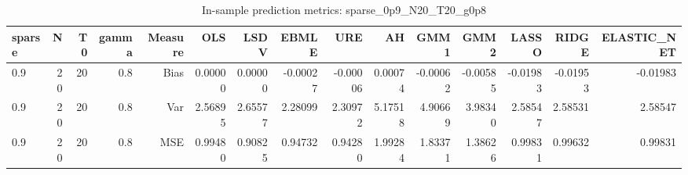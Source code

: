 \begin{table}[!htbp]\centering
\caption{In-sample prediction metrics: sparse_0p9_N20_T20_g0p8}
\label{tab:table2_sparse_0p9_N20_T20_g0p8}
\begin{tabular}{lrrrrrrrrrrrrrr}
\hline
sparse & N & T0 & gamma & Measure & OLS & LSDV & EBMLE & URE & AH & GMM1 & GMM2 & LASSO & RIDGE & ELASTIC_NET \\
\hline
0.9 & 20 & 20 & 0.8 & Bias & 0.00000 & 0.00000 & -0.00027 & -0.00006 & 0.00074 & -0.00062 & -0.00585 & -0.01983 & -0.01953 & -0.01983 \\
0.9 & 20 & 20 & 0.8 & Var & 2.56895 & 2.65577 & 2.28099 & 2.30972 & 5.17518 & 4.90669 & 3.98340 & 2.58547 & 2.58531 & 2.58547 \\
0.9 & 20 & 20 & 0.8 & MSE & 0.99480 & 0.90825 & 0.94732 & 0.94280 & 1.99284 & 1.83371 & 1.38626 & 0.99831 & 0.99632 & 0.99831 \\
\hline
\end{tabular}
\end{table}

